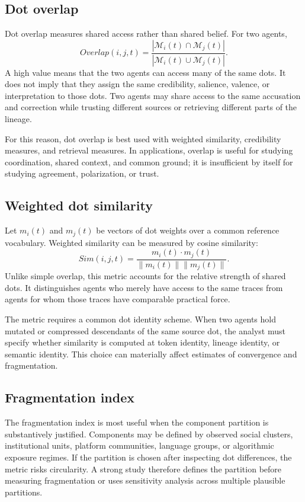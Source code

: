 \documentclass[11pt]{article}
\theoremstyle{remark}
\begin{document}
\subsection{Dot overlap}\label{dot-overlap}

Dot overlap measures shared access rather than shared belief. For two agents,
\[
Overlap(i,j,t)=\frac{|\mathcal M_i(t)\cap \mathcal M_j(t)|}{|\mathcal M_i(t)\cup \mathcal M_j(t)|}.
\]
A high value means that the two agents can access many of the same dots. It does not imply that they assign the same credibility, salience, valence, or interpretation to those dots. Two agents may share access to the same accusation and correction while trusting different sources or retrieving different parts of the lineage.

For this reason, dot overlap is best used with weighted similarity, credibility measures, and retrieval measures. In applications, overlap is useful for studying coordination, shared context, and common ground; it is insufficient by itself for studying agreement, polarization, or trust.

\subsection{Weighted dot similarity}\label{weighted-dot-similarity}

Let $m_i(t)$ and $m_j(t)$ be vectors of dot weights over a common reference vocabulary. Weighted similarity can be measured by cosine similarity:
\[
Sim(i,j,t)=\frac{m_i(t)\cdot m_j(t)}{\|m_i(t)\|\|m_j(t)\|}.
\]
Unlike simple overlap, this metric accounts for the relative strength of shared dots. It distinguishes agents who merely have access to the same traces from agents for whom those traces have comparable practical force.

The metric requires a common dot identity scheme. When two agents hold mutated or compressed descendants of the same source dot, the analyst must specify whether similarity is computed at token identity, lineage identity, or semantic identity. This choice can materially affect estimates of convergence and fragmentation.

\subsection{Fragmentation index}\label{fragmentation-index-metric}

The fragmentation index is most useful when the component partition is substantively justified. Components may be defined by observed social clusters, institutional units, platform communities, language groups, or algorithmic exposure regimes. If the partition is chosen after inspecting dot differences, the metric risks circularity. A strong study therefore defines the partition before measuring fragmentation or uses sensitivity analysis across multiple plausible partitions.
\end{document}
